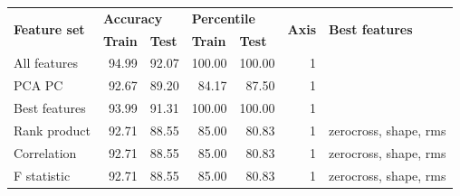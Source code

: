 \begin{table}[h]
\begin{adjustbox}{width=\textwidth}
\begin{tabular}{|l|rr|rr|r|l|}
\hline
\multirow{2}{*}{\textbf{Feature set}} & \multicolumn{2}{l|}{\textbf{Accuracy}}                                   & \multicolumn{2}{l|}{\textbf{Percentile}}                                 & \multicolumn{1}{l|}{\multirow{2}{*}{\textbf{Axis}}} & \multirow{2}{*}{\textbf{Best features}} \\ \cline{2-5}
                                      & \multicolumn{1}{l|}{\textbf{Train}} & \multicolumn{1}{l|}{\textbf{Test}} & \multicolumn{1}{l|}{\textbf{Train}} & \multicolumn{1}{l|}{\textbf{Test}} & \multicolumn{1}{l|}{}                               &                                         \\ \hline
All features                          & \multicolumn{1}{r|}{94.99}          & 92.07                              & \multicolumn{1}{r|}{100.00}         & 100.00                             & 1                                                   &                                         \\ \hline
PCA PC                                & \multicolumn{1}{r|}{92.67}          & 89.20                              & \multicolumn{1}{r|}{84.17}          & 87.50                              & 1                                                   &                                         \\ \hline
Best features                         & \multicolumn{1}{r|}{93.99}          & 91.31                              & \multicolumn{1}{r|}{100.00}         & 100.00                             & 1                                                   &                                         \\ \hline
Rank product                          & \multicolumn{1}{r|}{92.71}          & 88.55                              & \multicolumn{1}{r|}{85.00}          & 80.83                              & 1                                                   & zerocross, shape, rms                   \\ \hline
Correlation                           & \multicolumn{1}{r|}{92.71}          & 88.55                              & \multicolumn{1}{r|}{85.00}          & 80.83                              & 1                                                   & zerocross, shape, rms                   \\ \hline
F statistic                           & \multicolumn{1}{r|}{92.71}          & 88.55                              & \multicolumn{1}{r|}{85.00}          & 80.83                              & 1                                                   & zerocross, shape, rms                   \\ \hline

\end{tabular}
\end{adjustbox}
\end{table}
